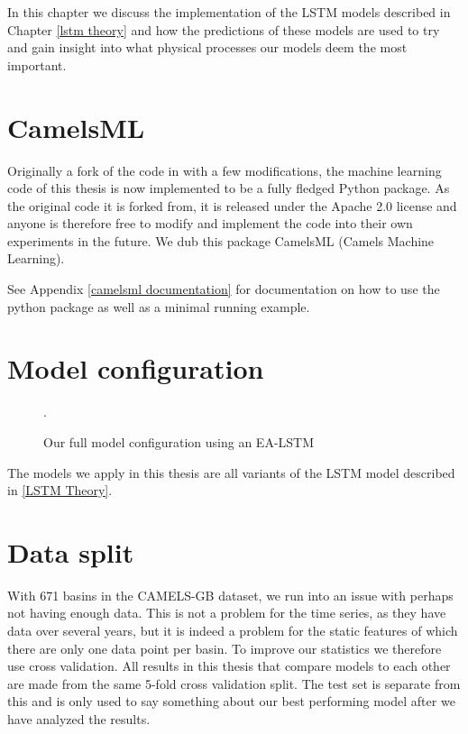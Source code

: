 In this chapter we discuss the implementation of the LSTM models described in Chapter 
\ref{lstm theory} and how the predictions of these models are used to try and gain 
insight into what physical processes our models deem the most important.
\section{CamelsML}
Originally a fork of the code in \cite{lstm_second_paper} with a few modifications, 
the machine learning code of this thesis is now implemented to be a fully fledged 
Python package. As the original code it is forked from, it is released under the 
Apache 2.0 license and anyone is therefore free to modify and implement the code 
into their own experiments in the future.
We dub this package CamelsML (Camels Machine Learning).


See Appendix \ref{camelsml documentation} for documentation on how to use the python 
package as well as a minimal running example.

\section{Model configuration}
\begin{figure}
\caption{Our full model configuration using an EA-LSTM \cite{lstm_second_paper}}.
\end{figure}
The models we apply in this thesis are all variants of the LSTM model described 
in \ref{LSTM Theory}.
\section{Data split}
With 671 basins in the CAMELS-GB dataset, we run into an issue with perhaps not 
having enough data. This is not a problem for the time series, as they have data 
over several years, but it is indeed a problem for the static features of which there 
are only one data point per basin. To improve our statistics we therefore use 
cross validation. All results in this thesis that compare models to each other 
are made from the same 5-fold cross validation split. The test set is separate 
from this and is only used to say something about our best performing model after 
we have analyzed the results.


